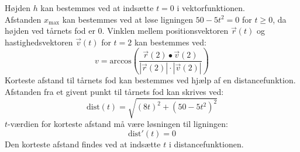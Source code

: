 \documentclass[../main.tex]{subfiles}
\begin{document}
\begin{tcolorbox}[title=Opgave 1,
    colback=blue!1!white,
    colframe=black,
    colbacktitle=blue!25!white,
    coltitle=red!25!black,
    fonttitle=\bfseries,
    subtitle style={boxrule=0.4pt,
    colback=blue!7!white} ]
        Højden \(h\) kan bestemmes ved at indsætte \(t=0\) i vektorfunktionen.\\
        Afstanden \(x_{\text{max}}\) kan bestemmes ved at løse ligningen \(50-5t^2=0\) for \(t \geq 0\), da højden ved tårnets fod er 0.
        Vinklen mellem positionsvektoren \(\vec{r}(t)\) og hastighedsvektoren \(\vec{v}(t)\) for \(t = 2\) kan bestemmes ved:
        \[v = \text{arccos} \left( \frac{\vec{r}(2) \bullet \vec{v}(2)}{|\vec{r}(2)| \cdot |\vec{v}(2)|}\right)\]
        Korteste afstand til tårnets fod kan bestemmes ved hjælp af en distancefunktion. Afstanden fra
        et givent punkt til tårnets fod kan skrives ved:
        \[\text{dist}(t) = \sqrt{(8t)^2+(50-5t^2)^2}\]
        \(t\)-værdien for korteste afstand må være løsningen til ligningen:
        \[\text{dist}'(t)=0\]
        Den korteste afstand findes ved at indsætte \(t\) i distancefunktionen.
\end{tcolorbox}
\end{document}
